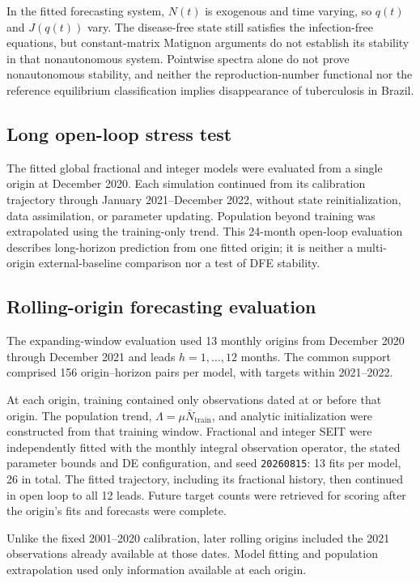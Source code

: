 \documentclass[pdflatex,sn-mathphys-ay]{sn-jnl}
\begin{document}
In the fitted forecasting system, $N(t)$ is exogenous and time varying, so $q(t)$ and $J(q(t))$ vary. The disease-free state still satisfies the infection-free equations, but constant-matrix Matignon arguments do not establish its stability in that nonautonomous system. Pointwise spectra alone do not prove nonautonomous stability, and neither the reproduction-number functional nor the reference equilibrium classification implies disappearance of tuberculosis in Brazil.

\subsection{Long open-loop stress test}

The fitted global fractional and integer models were evaluated from a single origin at December 2020. Each simulation continued from its calibration trajectory through January 2021--December 2022, without state reinitialization, data assimilation, or parameter updating. Population beyond training was extrapolated using the training-only trend. This 24-month open-loop evaluation describes long-horizon prediction from one fitted origin; it is neither a multi-origin external-baseline comparison nor a test of DFE stability.

\subsection{Rolling-origin forecasting evaluation}

The expanding-window evaluation used 13 monthly origins from December 2020 through December 2021 and leads $h=1,\ldots,12$ months. The common support comprised 156 origin--horizon pairs per model, with targets within 2021--2022.

At each origin, training contained only observations dated at or before that origin. The population trend, $\Lambda=\mu\bar N_{\mathrm{train}}$, and analytic initialization were constructed from that training window. Fractional and integer SEIT were independently fitted with the monthly integral observation operator, the stated parameter bounds and DE configuration, and seed \texttt{20260815}: 13 fits per model, 26 in total. The fitted trajectory, including its fractional history, then continued in open loop to all 12 leads. Future target counts were retrieved for scoring after the origin's fits and forecasts were complete.

Unlike the fixed 2001--2020 calibration, later rolling origins included the 2021 observations already available at those dates. Model fitting and population extrapolation used only information available at each origin.
\end{document}
